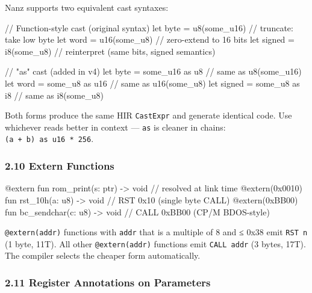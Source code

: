 \documentclass[
  11pt,
]{article}
\newenvironment{Shaded}{\begin{snugshade}}{\end{snugshade}}
\newcommand{\NormalTok}[1]{#1}
\begin{document}
Nanz supports two equivalent cast syntaxes:

\begin{Shaded}
\begin{Highlighting}[]
\NormalTok{// Function{-}style cast (original syntax)}
\NormalTok{let byte = u8(some\_u16)     // truncate: take low byte}
\NormalTok{let word = u16(some\_u8)     // zero{-}extend to 16 bits}
\NormalTok{let signed = i8(some\_u8)    // reinterpret (same bits, signed semantics)}

\NormalTok{// "as" cast (added in v4)}
\NormalTok{let byte = some\_u16 as u8   // same as u8(some\_u16)}
\NormalTok{let word = some\_u8 as u16   // same as u16(some\_u8)}
\NormalTok{let signed = some\_u8 as i8  // same as i8(some\_u8)}
\end{Highlighting}
\end{Shaded}

Both forms produce the same HIR \texttt{CastExpr} and generate identical
code. Use whichever reads better in context --- \texttt{as} is cleaner
in chains: \texttt{(a\ +\ b)\ as\ u16\ *\ 256}.

\hypertarget{extern-functions}{%
\subsubsection{2.10 Extern Functions}\label{extern-functions}}

\begin{Shaded}
\begin{Highlighting}[]
\NormalTok{@extern fun rom\_print(s: ptr) {-}\textgreater{} void           // resolved at link time}
\NormalTok{@extern(0x0010) fun rst\_10h(a: u8) {-}\textgreater{} void      // RST 0x10 (single byte CALL)}
\NormalTok{@extern(0xBB00) fun bc\_sendchar(c: u8) {-}\textgreater{} void  // CALL 0xBB00 (CP/M BDOS{-}style)}
\end{Highlighting}
\end{Shaded}

\texttt{@extern(addr)} functions with \texttt{addr} that is a multiple
of 8 and ≤ 0x38 emit \texttt{RST\ n} (1 byte, 11T). All other
\texttt{@extern(addr)} functions emit \texttt{CALL\ addr} (3 bytes,
17T). The compiler selects the cheaper form automatically.

\hypertarget{register-annotations-on-parameters}{%
\subsubsection{2.11 Register Annotations on
Parameters}\label{register-annotations-on-parameters}}
\end{document}
